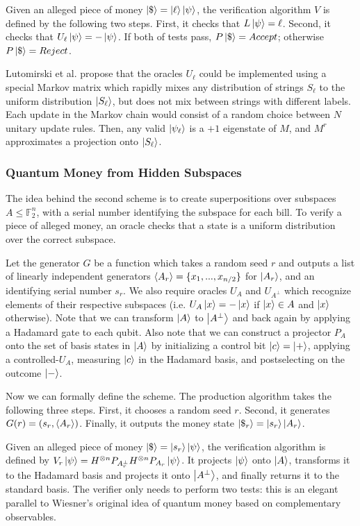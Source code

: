 \documentclass[12pt]{article}
\begin{document}
Given an alleged piece of money $\Ket{\$} = \Ket{\ell}\Ket{\psi}$, the verification algorithm $V$ is defined by the following two steps.  First, it checks that $L\Ket{\psi} = \ell$.  Second, it checks that $U_\ell\Ket{\psi} = -\Ket{\psi}$.  If both of tests pass, $P\Ket{\$} = Accept$; otherwise $P\Ket{\$} = Reject$.

Lutomirski et al. propose that the oracles $U_\ell$ could be implemented using a special Markov matrix which rapidly mixes any distribution of strings $S_\ell$ to the uniform distribution $\Ket{S_\ell}$, but does not mix between strings with different labels.  Each update in the Markov chain would consist of a random choice between $N$ unitary update rules.  Then, any valid $\Ket{\psi_\ell}$ is a $+1$ eigenstate of $M$, and $M^r$ approximates a projection onto $\Ket{S_\ell}$.

\subsubsection{Quantum Money from Hidden Subspaces}
The idea behind the second scheme is to create superpositions over subspaces $A \leq \mathbb{F}_2^n$, with a serial number identifying the subspace for each bill.  To verify a piece of alleged money, an oracle checks that a state is a uniform distribution over the correct subspace.

Let the generator $G$ be a function which takes a random seed $r$ and outputs a list of linearly independent generators $\Braket{A_r} = \{x_1,...,x_{n/2}\}$ for $\Ket{A_r}$, and an identifying serial number $s_r$.  We also require oracles $U_A$ and $U_{A^\perp}$ which recognize elements of their respective subspaces (i.e. $U_A\Ket{x} = -\Ket{x}$  if $\Ket{x} \in A$ and $\Ket{x}$ otherwise).  Note that we can transform $\Ket{A}$ to $\Ket{A^\perp}$ and back again by applying a Hadamard gate to each qubit.  Also note that we can construct a projector $P_A$ onto the set of basis states in $\Ket{A}$ by initializing a control bit $\Ket{c} = \Ket{+}$, applying a controlled-$U_A$, measuring $\Ket{c}$ in the Hadamard basis, and postselecting on the outcome $\Ket{-}$.

Now we can formally define the scheme.  The production algorithm takes the following three steps.  First, it chooses a random seed $r$.  Second, it generates $G(r) = \left(s_r,\Braket{A_r}\right)$.  Finally, it outputs the money state $\Ket{\$_r} = \Ket{s_r}\Ket{A_r}$.

Given an alleged piece of money $\Ket{\$} = \Ket{s_r}\Ket{\psi}$, the verification algorithm is defined by $V_r\Ket{\psi} = H^{\otimes n} P_{A_r^\perp} H^{\otimes n} P_{A_r} \Ket{\psi}$.  It projects $\Ket{\psi}$ onto $\Ket{A}$, transforms it to the Hadamard basis and projects it onto $\Ket{A^\perp}$, and finally returns it to the standard basis.  The verifier only needs to perform two tests: this is an elegant parallel to Wiesner's original idea of quantum money based on complementary observables.
\end{document}
